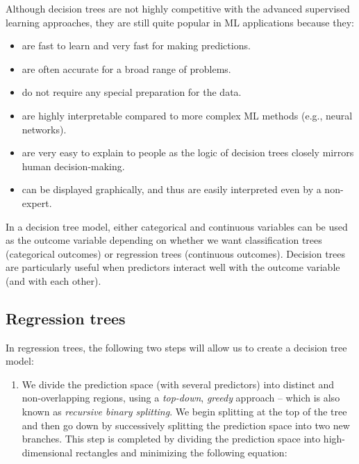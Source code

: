 \documentclass[]{book}
\providecommand{\tightlist}{%
  \setlength{\itemsep}{0pt}\setlength{\parskip}{0pt}}
\begin{document}
Although decision trees are not highly competitive with the advanced supervised learning approaches, they are still quite popular in ML applications because they:

\begin{itemize}
\tightlist
\item
  are fast to learn and very fast for making predictions.
\item
  are often accurate for a broad range of problems.
\item
  do not require any special preparation for the data.
\item
  are highly interpretable compared to more complex ML methods (e.g., neural networks).
\item
  are very easy to explain to people as the logic of decision trees closely mirrors human decision-making.
\item
  can be displayed graphically, and thus are easily interpreted even by a non-expert.
\end{itemize}

In a decision tree model, either categorical and continuous variables can be used as the outcome variable depending on whether we want classification trees (categorical outcomes) or regression trees (continuous outcomes). Decision trees are particularly useful when predictors interact well with the outcome variable (and with each other).

\hypertarget{regression-trees}{%
\subsection{Regression trees}\label{regression-trees}}

In regression trees, the following two steps will allow us to create a decision tree model:

\begin{enumerate}
\def\labelenumi{\arabic{enumi}.}
\tightlist
\item
  We divide the prediction space (with several predictors) into distinct and non-overlapping regions, using a \emph{top-down}, \emph{greedy} approach -- which is also known as \emph{recursive binary splitting}. We begin splitting at the top of the tree and then go down by successively splitting the prediction space into two new branches. This step is completed by dividing the prediction space into high-dimensional rectangles and minimizing the following equation:
\end{enumerate}
\end{document}
